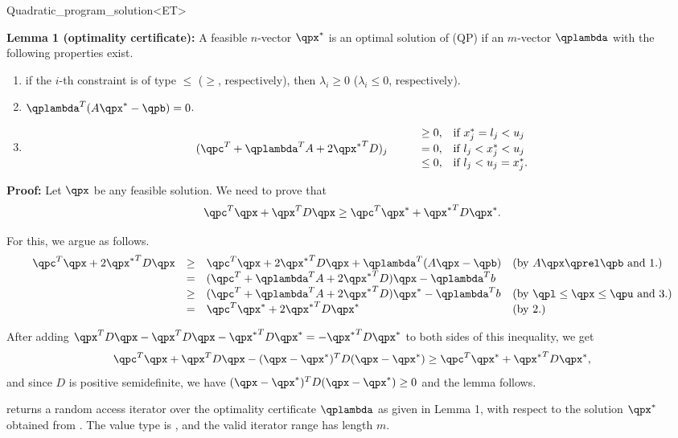 \begin{ccRefClass}{Quadratic_program_solution<ET>}
\begin{ccAdvanced}
{\bf Lemma 1 (optimality certificate):} A feasible $n$-vector $\qpx^*$ 
is an optimal solution of (QP) if an $m$-vector $\qplambda$ with the
following properties exist.
\begin{enumerate}
\item if the $i$-th constraint is of type $\leq$ ($\geq$, respectively), 
then $\lambda_i\geq 0$ ($\lambda_i\leq 0$, respectively).
\item $\qplambda^T(A\qpx^*-\qpb) = 0$.
\item \[
\begin{array}{llll}
&&\geq 0, & \mbox{if $x^*_j = l_j < u_j$} \\
(\qpc^T + \qplambda^T A + 2{\qpx^*}^TD)_j& \quad  &= 0, & \mbox{if $l_j < x^*_j < u_j$} \\
&&\leq 0, & \mbox{if $l_j < u_j = x^*_j$.}
\end{array}\]
\end{enumerate}

{\bf Proof:} Let $\qpx$ be any feasible solution. We need to prove that
\[\qpc^T\qpx + \qpx^TD\qpx \geq \qpc^T\qpx^* + {\qpx^*}^TD\qpx^*.\]

For this, we argue as follows.
\[
\begin{array}{lcll}
\qpc^T\qpx + 2{\qpx^*}^TD\qpx &\geq& \qpc^T\qpx + 2{\qpx^*}^TD\qpx + \qplambda^T(A\qpx-\qpb) &  
\mbox{(by $A\qpx\qprel \qpb$ and 1.)} \\
                  &=& (\qpc^T + \qplambda^T A + 2{\qpx^*}^TD)\qpx - \qplambda^Tb \\
                  &\geq& (\qpc^T + \qplambda^T A + 2{\qpx^*}^TD)\qpx^* - \qplambda^Tb &
\mbox{(by $\qpl\leq \qpx \leq \qpu$ and 3.)} \\
                  &=& \qpc^T\qpx^* + 2{\qpx^*}^TD\qpx^* &
\mbox{(by 2.)}
\end{array}
\]

After adding $\qpx^TD\qpx - \qpx^TD\qpx - {\qpx^*}^TD\qpx^* = -{\qpx^*}^TD\qpx^*$ to both sides of
this inequality, we get
\[
\qpc^T\qpx + \qpx^TD\qpx - (\qpx-\qpx^*)^TD(\qpx-\qpx^*) \geq \qpc^T\qpx^* + {\qpx^*}^TD\qpx^*,
\] 
and since $D$ is positive semidefinite, we have
$(\qpx-\qpx^*)^TD(\qpx-\qpx^*)\geq 0$ and the lemma follows.


{returns a random access iterator over the optimality certificate 
$\qplambda$ as given in Lemma 1, with respect to the solution $\qpx^*$ 
obtained from \ccVar{}. The value type
is , and the valid iterator range has length $m$.
}


\end{ccAdvanced}
\end{ccRefClass}
